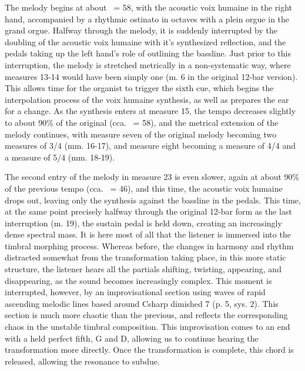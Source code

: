 \documentclass[12pt,twoside,maitrise]{dms_ks}
\theoremstyle{definition}
\begin{document}
{The melody begins at about \musQuarter\ = 58, with the acoustic voix humaine in the right hand, accompanied by a rhythmic ostinato in octaves with a plein orgue in the grand orgue. 
Halfway through the melody, it is suddenly interrupted by the doubling of the acoustic voix humaine with it's synthesized reflection, and the pedals taking up the left hand's role of outlining the bassline. 
Just prior to this interruption, the melody is stretched metrically in a non-systematic way, where measures 13-14 would have been simply one (m. 6 in the original 12-bar version). 
This allows time for the organist to trigger the sixth cue, which begins the interpolation process of the voix humaine synthesis, as well as prepares the ear for a change. 
As the synthesis enters at measure 15, the tempo decreases slightly to about 90\% of the original (cca. \musQuarter\ = 58), and the metrical extension of the melody continues, with measure seven of the original melody becoming two measures of 3/4 (mm. 16-17), and measure eight becoming a measure of 4/4 and a measure of 5/4 (mm. 18-19). 

The second entry of the melody in measure 23 is even slower, again at about 90\% of the previous tempo (cca. 
\musQuarter\ = 46), and this time, the acoustic voix humaine drops out, leaving only the synthesis against the bassline in the pedals. 
This time, at the same point precisely halfway through the original 12-bar form as the last interruption (m. 
19), the sustain pedal is held down, creating an increasingly dense spectral mass. 
It is here most of all that the listener is immersed into the timbral morphing process. 
Whereas before, the changes in harmony and rhythm distracted somewhat from the transformation taking place, in this more static structure, the listener hears all the partials shifting, twisting, appearing, and disappearing, as the sound becomes increasingly complex. 
This moment is interrupted, however, by an improvisational section using waves of rapid ascending melodic lines based around Csharp dimished 7 (p. 5, sys. 2). 
This section is much more chaotic than the previous, and reflects the corresponding chaos in the unstable timbral composition. 
This improvisation comes to an end with a held perfect fifth, G and D, allowing us to continue hearing the transformation more directly. 
Once the transformation is complete, this chord is released, allowing the resonance to subdue. 

}
\end{document}
